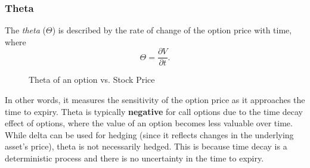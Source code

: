 \subsubsection{Theta}
The \textit{theta} ($\Theta$) is described by the rate of change of the option price with time, where
\begin{equation}
    \Theta = \frac{\partial V}{\partial t}.
\end{equation}

\begin{figure}[H]
    \centering
    \caption{Theta of an option vs. Stock Price}
    \label{fig:theta-plot}
\end{figure}

In other words, it measures the sensitivity of the option price as it approaches the time to expiry. Theta is typically \textbf{negative} for call options due to the time decay effect of options, where the value of an option becomes less valuable over time. 
While delta can be used for hedging (since it reflects changes in the underlying asset's price), theta is not necessarily hedged. This is because time decay is a deterministic process and there is no
uncertainty in the time to expiry. 


